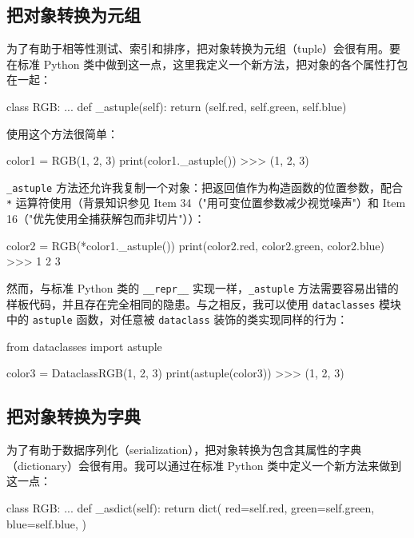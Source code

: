 \subsection{把对象转换为元组}

为了有助于相等性测试、索引和排序，把对象转换为元组（tuple）会很有用。要在标准 Python 类中做到这一点，这里我定义一个新方法，把对象的各个属性打包在一起：

\begin{codebox}[python]
class RGB:
    ...
    def _astuple(self):
        return (self.red, self.green, self.blue)
\end{codebox}

使用这个方法很简单：

\begin{codebox}[python]
color1 = RGB(1, 2, 3)
print(color1._astuple())
>>>
(1, 2, 3)
\end{codebox}

\texttt{\_astuple} 方法还允许我复制一个对象：把返回值作为构造函数的位置参数，配合 \texttt{*} 运算符使用（背景知识参见 Item 34（"用可变位置参数减少视觉噪声"）和 Item 16（"优先使用全捕获解包而非切片"））：

\begin{codebox}[python]
color2 = RGB(*color1._astuple())
print(color2.red, color2.green, color2.blue)
>>>
1 2 3
\end{codebox}

然而，与标准 Python 类的 \texttt{\_\_repr\_\_} 实现一样，\texttt{\_astuple} 方法需要容易出错的样板代码，并且存在完全相同的隐患。与之相反，我可以使用 \texttt{dataclasses} 模块中的 \texttt{astuple} 函数，对任意被 \texttt{dataclass} 装饰的类实现同样的行为：

\begin{codebox}[python]
from dataclasses import astuple

color3 = DataclassRGB(1, 2, 3)
print(astuple(color3))
>>>
(1, 2, 3)
\end{codebox}

\subsection{把对象转换为字典}

为了有助于数据序列化（serialization），把对象转换为包含其属性的字典（dictionary）会很有用。我可以通过在标准 Python 类中定义一个新方法来做到这一点：

\begin{codebox}[python]
class RGB:
    ...
    def _asdict(self):
        return dict(
            red=self.red,
            green=self.green,
            blue=self.blue,
        )
\end{codebox}


